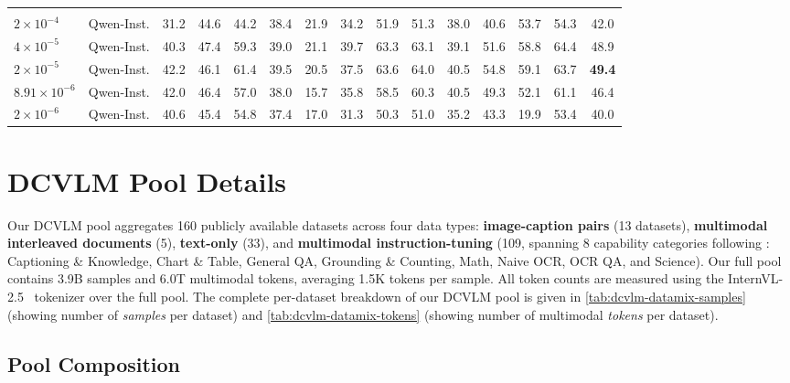 \begin{table}[!h]
{\begin{tabular}{llccccccccccccc}
        \midrule
        \rowcolor{gray!8} \multicolumn{15}{l}{\textit{4B model}} \\
        $2 \times 10^{-4}$    & Qwen-Inst.  & 31.2 & 44.6 & 44.2 & 38.4 & 21.9 & 34.2 & 51.9 & 51.3 & 38.0 & 40.6 & 53.7 & 54.3 & 42.0 \\
        $4 \times 10^{-5}$    & Qwen-Inst.  & 40.3 & 47.4 & 59.3 & 39.0 & 21.1 & 39.7 & 63.3 & 63.1 & 39.1 & 51.6 & 58.8 & 64.4 & 48.9 \\
        $2 \times 10^{-5}$    & Qwen-Inst.  & 42.2 & 46.1 & 61.4 & 39.5 & 20.5 & 37.5 & 63.6 & 64.0 & 40.5 & 54.8 & 59.1 & 63.7 & \textbf{49.4} \\
        $8.91 \times 10^{-6}$ & Qwen-Inst.  & 42.0 & 46.4 & 57.0 & 38.0 & 15.7 & 35.8 & 58.5 & 60.3 & 40.5 & 49.3 & 52.1 & 61.1 & 46.4 \\
        $2 \times 10^{-6}$    & Qwen-Inst.  & 40.6 & 45.4 & 54.8 & 37.4 & 17.0 & 31.3 & 50.3 & 51.0 & 35.2 & 43.3 & 19.9 & 53.4 & 40.0 \\
        \bottomrule
    \end{tabular}
    }
\end{table}
\clearpage



\section{DCVLM Pool Details}\label{app:dataset_pool}

Our DCVLM pool aggregates 160 publicly available datasets across four data types:
\textbf{image-caption pairs} (13 datasets), \textbf{multimodal interleaved documents} (5),
\textbf{text-only} (33), and \textbf{multimodal instruction-tuning} (109,
spanning 8 capability categories following \cite{wiedmann2025finevision}: Captioning \& Knowledge, Chart \& Table,
General QA, Grounding \& Counting, Math, Naive OCR, OCR QA, and Science).
Our full pool contains 3.9B samples and 6.0T
multimodal tokens, averaging 1.5K tokens per sample. All token counts
are measured using the InternVL-2.5~\citep{chen2024expanding} tokenizer
over the full pool.
The complete per-dataset breakdown of our DCVLM pool is given in \cref{tab:dcvlm-datamix-samples} (showing number of \textit{samples} per dataset) and \cref{tab:dcvlm-datamix-tokens} (showing number of multimodal \textit{tokens} per dataset).

\subsection{Pool Composition}\label{app:pool-composition}

